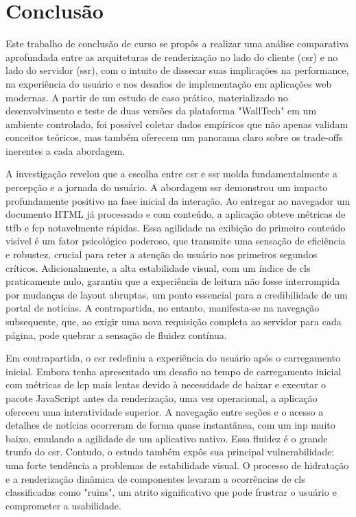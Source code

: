 \chapter{Conclusão}
\label{cap:conclusao}

Este trabalho de conclusão de curso se propôs a realizar uma análise comparativa aprofundada entre as arquiteturas de renderização no lado do cliente (\acrshort{csr}) e no lado do servidor (\acrshort{ssr}), com o intuito de dissecar suas implicações na performance, na experiência do usuário e nos desafios de implementação em aplicações web modernas. A partir de um estudo de caso prático, materializado no desenvolvimento e teste de duas versões da plataforma "WallTech" em um ambiente controlado, foi possível coletar dados empíricos que não apenas validam conceitos teóricos, mas também oferecem um panorama claro sobre os trade-offs inerentes a cada abordagem.

A investigação revelou que a escolha entre \acrshort{csr} e \acrshort{ssr} molda fundamentalmente a percepção e a jornada do usuário. A abordagem \acrshort{ssr} demonstrou um impacto profundamente positivo na fase inicial da interação. Ao entregar ao navegador um documento HTML já processado e com conteúdo, a aplicação obteve métricas de \acrfull{ttfb} e \acrfull{fcp} notavelmente rápidas. Essa agilidade na exibição do primeiro conteúdo visível é um fator psicológico poderoso, que transmite uma sensação de eficiência e robustez, crucial para reter a atenção do usuário nos primeiros segundos críticos. Adicionalmente, a alta estabilidade visual, com um índice de \acrfull{cls} praticamente nulo, garantiu que a experiência de leitura não fosse interrompida por mudanças de layout abruptas, um ponto essencial para a credibilidade de um portal de notícias. A contrapartida, no entanto, manifesta-se na navegação subsequente, que, ao exigir uma nova requisição completa ao servidor para cada página, pode quebrar a sensação de fluidez contínua.

Em contrapartida, o \acrshort{csr} redefiniu a experiência do usuário após o carregamento inicial. Embora tenha apresentado um desafio no tempo de carregamento inicial com métricas de \acrfull{lcp} mais lentas devido à necessidade de baixar e executar o pacote JavaScript antes da renderização, uma vez operacional, a aplicação ofereceu uma interatividade superior. A navegação entre seções e o acesso a detalhes de notícias ocorreram de forma quase instantânea, com um \acrfull{inp} muito baixo, emulando a agilidade de um aplicativo nativo. Essa fluidez é o grande trunfo do \acrshort{csr}. Contudo, o estudo também expôs sua principal vulnerabilidade: uma forte tendência a problemas de estabilidade visual. O processo de hidratação e a renderização dinâmica de componentes levaram a ocorrências de \acrfull{cls} classificadas como "ruins", um atrito significativo que pode frustrar o usuário e comprometer a usabilidade.

